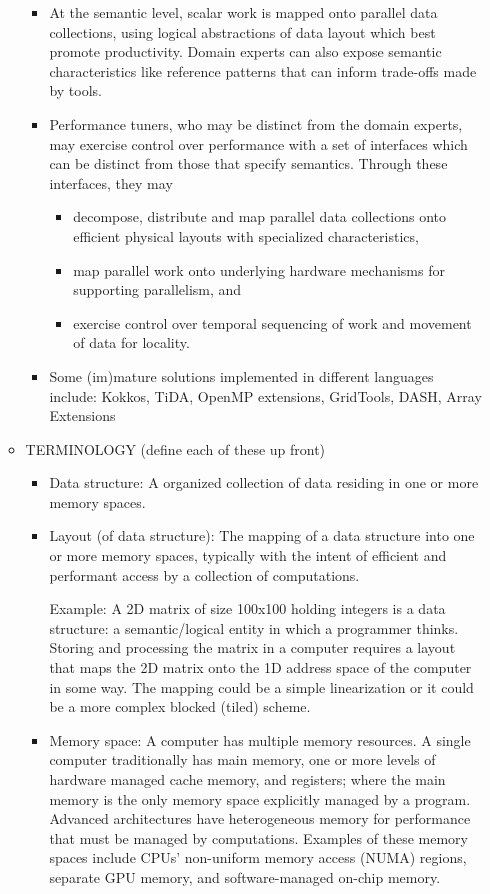 \begin{itemize}
\begin{itemize}
\begin{itemize}
  \item At the semantic level, scalar work is mapped onto parallel data collections, using logical abstractions of data layout which best promote productivity.  Domain experts can also expose semantic characteristics like reference patterns that can inform trade-offs made by tools.
  \item Performance tuners, who may be distinct from the domain experts, may exercise control over performance with a set of interfaces which can be distinct from those that specify semantics.  Through these interfaces, they may 
    \begin{itemize}
    \item decompose, distribute and map parallel data collections onto efficient physical layouts with specialized characteristics, 
    \item map parallel work onto underlying hardware mechanisms for supporting parallelism, and 
    \item exercise control over temporal sequencing of work and movement of data for locality.
    \end{itemize}
  \item Some (im)mature solutions implemented in different languages include: Kokkos, TiDA, OpenMP extensions, GridTools, DASH, Array Extensions
\end{itemize}


\item TERMINOLOGY (define each of these up front)
  \begin{itemize}

 \item Data structure: A organized collection of data residing in one or more memory spaces. 

  \item Layout (of data structure):
    The mapping of a data structure into one or more memory spaces, typically with the intent of efficient and performant access by a collection of computations.

    Example: A 2D matrix of size 100x100 holding integers is a data structure: a semantic/logical entity in which a programmer thinks. Storing and processing the matrix in a computer requires a layout that maps the 2D matrix onto the 1D address space of the computer in some way. The mapping could be a simple linearization or it could be a more complex blocked (tiled) scheme.

  \item Memory space: A computer has multiple memory resources.  A single computer traditionally has main memory, one or more levels of hardware managed cache memory, and registers; where the main memory is the only memory space explicitly managed by a program.  Advanced architectures have heterogeneous memory for performance that must be managed by computations.  Examples of these memory spaces include CPUs' non-uniform memory access (NUMA) regions, separate GPU memory, and software-managed on-chip memory.


\end{itemize}
\end{itemize}
\end{itemize}
